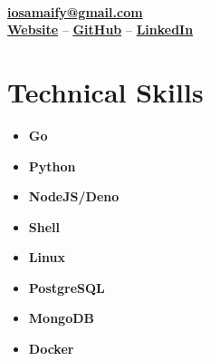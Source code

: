 \documentclass[letterpaper, 10pt]{article}
\author{Osama Muhammad}
\date{\today}
\makeatletter
\renewcommand{\maketitle}{
	\vspace{1.5em}
	\begin{center}
		\par{\huge\bfseries{\theauthor}}
		\vspace{0.7em}\\
		\href{mailto:iosamaify@gmail.com}{\textbf{iosamaify@gmail.com}}
		\vspace{0.7em}\\
		\href{https://osamai.github.io}{\textbf{Website}} --
		\href{https://github.com/osamai}{\textbf{GitHub}} --
		\href{https://www.linkedin.com/in/iosama}{\textbf{LinkedIn}}
	\end{center}
}
\newcommand{\hr}{\par{\vspace{-.3\ht\strutbox}\noindent\hrulefill\par}}
\makeatother
\begin{document}
\maketitle

\hr

\section{Technical Skills}

\begin{multicols}{2}
	\begin{itemize}
		\item \textbf{Go}
		\item \textbf{Python}
		\item \textbf{NodeJS/Deno}
		\item \textbf{Shell}
		\item \textbf{Linux}
		\item \textbf{PostgreSQL}
		\item \textbf{MongoDB}
		\item \textbf{Docker}
	\end{itemize}
\end{multicols}
\end{document}
